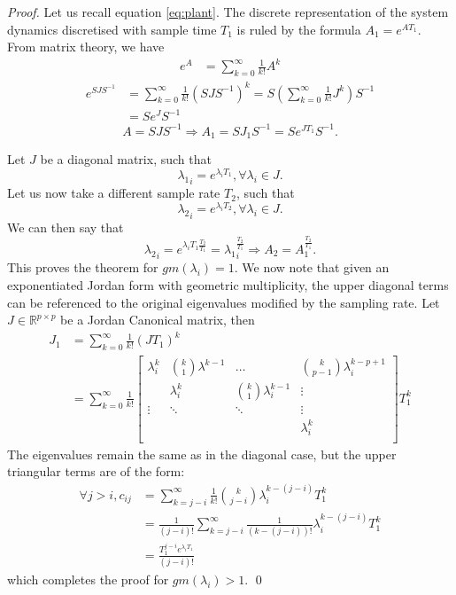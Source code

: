 \documentclass[sigconf]{llncs}
\newcommand{\mat}[1]{{#1}}
\renewcommand{\vec}[1]{{#1}}
\begin{document}
 \begin{proof}
 Let us recall equation \ref{eq:plant}. The discrete representation of the system dynamics discretised with sample time $T_1$ is ruled by the formula
 $\mat{A}_1 = e^{\mat{A} T_1}$. From matrix theory, we have 
\begin{align*}
 e^{\mat{A}}&=\sum_{k=0}^\infty \frac{1}{k!}\mat{A}^k
\end{align*} 
\begin{align*} 
 e^{\mat{S}\mat{J}\mat{S}^{-1}}&=\sum_{k=0}^\infty \frac{1}{k!}\left(\mat{S}\mat{J}\mat{S}^{-1}\right)^k
 =\mat{S} \left (\sum_{k=0}^\infty \frac{1}{k!}\mat{J}^k\right) \mat{S}^{-1}\nonumber\\
 &=\mat{S}e^{\mat{J}}\mat{S}^{-1}
\end{align*} 
\begin{equation*}
\mat{A}=\mat{S}\mat{J}\mat{S}^{-1} \Rightarrow \vec{A}_1 = \mat{S}\mat{J}_1\mat{S}^{-1}= \mat{S}e^{\mat{J} T_1}\mat{S}^{-1}.
 \end{equation*}
 
 Let $\mat{J}$ be a diagonal matrix, such that 
 $${\lambda_1}_i=e^{\lambda_i T_1}, \forall \lambda_i \in \mat{J}.$$
 Let us now take a different sample rate $T_2$, such that 
 $${\lambda_2}_i=e^{\lambda_i T_2}, \forall \lambda_i \in \mat{J}.$$
 We can then say that 
 \begin{equation*}
 {\lambda_2}_i=e^{\lambda_i T_1 \frac{T_2}{T_1}}={\lambda_1}_i^{\frac{T_2}{T_1}} \Rightarrow A_2=A_1^{\frac{T_2}{T_1}}.
 \end{equation*}
 This proves the theorem for $gm(\lambda_i)=1$.
 We now note that given an exponentiated Jordan form with geometric multiplicity, the upper diagonal terms can be
 referenced to the original eigenvalues modified by the sampling rate.
  Let $\mat{J}\in \mathbb{R}^{p \times p}$ be a Jordan Canonical matrix, then
\begin{align*}
 \mat{J}_1&=\sum_{k=0}^\infty \frac{1}{k!}\left(\mat{J}T_1\right)^k\nonumber\\
 &=\sum_{k=0}^\infty \frac{1}{k!} \left [ \begin{array}{cccc}
 \lambda_i^k  & \binom{k}{1}  \lambda^{k-1} & \hdots  & \binom{k}{p-1} \lambda_i^{k-p+1} \\
& \lambda_i^k  & \binom{k}{1}  \lambda_i^{k-1} & \vdots \\
\vdots & \ddots & \ddots & \vdots \\
& &  &\lambda_i^k \\
\end{array} \right ] T_1^k
\end{align*}
The eigenvalues remain the same as in the diagonal case, but the upper triangular terms are of the form:
\begin{align*}
\forall j>i, c_{ij}&=\sum_{k=j-i}^\infty \frac{1}{k!}\binom{k}{j-i} \lambda_i^{k-(j-i)}T_1^k\\
&=\frac{1}{(j-i)!}\sum_{k=j-i}^\infty \frac{1}{(k-(j-i))!} \lambda_i^{k-(j-i)}T_1^k\nonumber\\
&=\frac{T_1^{j-i}e^{\lambda_i T_1}}{(j-i)!}\nonumber
\end{align*}
which completes the proof for $gm(\lambda_i)>1$. \qed
\end{proof}
\end{document}
